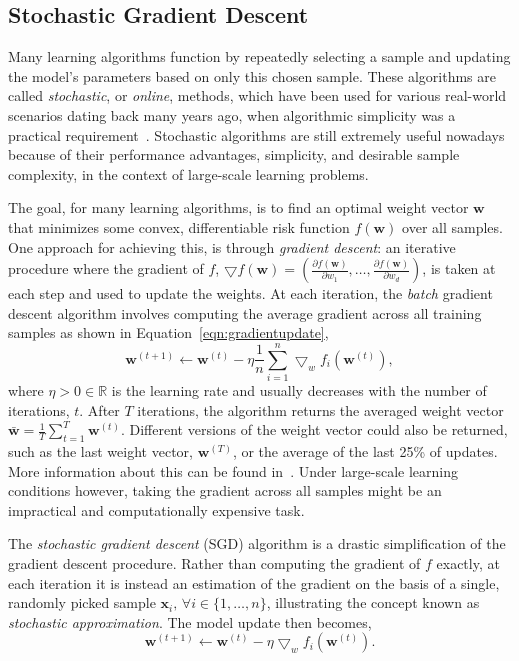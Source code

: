 \documentclass[reqno]{vcuthesis}
\newcommand{\reals}{{\mathbb{R}}}
\numberwithin{equation}{chapter}
\begin{document}
\subsection{Stochastic Gradient Descent}
Many learning algorithms function by repeatedly selecting a sample and updating the model's parameters based on only this chosen sample. These algorithms are called \textit{stochastic}, or \textit{online}, methods, which have been used for various real-world scenarios dating back many years ago, when algorithmic simplicity was a practical requirement~\cite{bottou2002stochastic,robbins1951textordfemininea,widrow1960adaptive}. Stochastic algorithms are still extremely useful nowadays because of their performance advantages, simplicity, and desirable sample complexity, in the context of large-scale learning problems. %

The goal, for many learning algorithms, is to find an optimal weight vector $\bm w$ that minimizes some convex, differentiable risk function $f(\bm{w})$ over all samples. One approach for achieving this, is through \textit{gradient descent}: an iterative procedure where the gradient of $f$, $\bigtriangledown f(\bm{w}) = \left(\frac{\partial f(\bm{w})}{\partial w_1}, \ldots, \frac{\partial f(\bm{w})}{\partial w_d}\right)$, is taken at each step and used to update the weights. At each iteration, the \textit{batch} gradient descent algorithm involves computing the average gradient across all training samples as shown in Equation~\ref{eqn:gradientupdate},
\begin{equation}
\bm{w}^{(t+1)} \leftarrow \bm{w}^{(t)} - \eta \frac{1}{n} \sum_{i=1}^n\bigtriangledown_w f_i(\bm{w}^{(t)}),
\label{eqn:gradientupdate}
\end{equation}
where $\eta > 0 \in \reals$ is the learning rate and usually decreases with the number of iterations, $t$. After $T$ iterations, the algorithm returns the averaged weight vector $\bm{\bar{w}} = \frac{1}{T}\sum_{t=1}^T \bm{w}^{(t)}$. Different versions of the weight vector could also be returned, such as the last weight vector, $\bm w^{(T)}$, or the average of the last 25\% of updates. More information about this can be found in~\cite{Melki2016}. Under large-scale learning conditions however, taking the gradient across all samples might be an impractical and computationally expensive task.

The \textit{stochastic gradient descent} (SGD) algorithm is a drastic simplification of the gradient descent procedure. Rather than computing the gradient of $f$ exactly, at each iteration it is instead an estimation of the gradient on the basis of a single, randomly picked sample $\bm x_i,\, \forall i \in \{1, \ldots, n\}$, illustrating the concept known as \textit{stochastic approximation}. The model update then becomes,
\begin{equation}
\bm{w}^{(t+1)} \leftarrow \bm{w}^{(t)} - \eta\bigtriangledown_w f_i(\bm{w}^{(t)}).
\label{eqn:gradientupdateo}
\end{equation}
\end{document}
